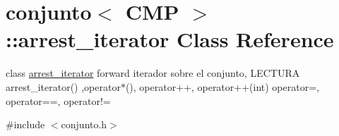 \hypertarget{classconjunto_1_1arrest__iterator}{}\section{conjunto$<$ C\+M\+P $>$\+:\+:arrest\+\_\+iterator Class Reference}
\label{classconjunto_1_1arrest__iterator}


class \hyperlink{classconjunto_1_1arrest__iterator}{arrest\+\_\+iterator} forward iterador sobre el conjunto, L\+E\+C\+T\+U\+R\+A arrest\+\_\+iterator() ,operator$\ast$(), operator++, operator++(int) operator=, operator==, operator!=  




{\ttfamily \#include $<$conjunto.\+h$>$}

